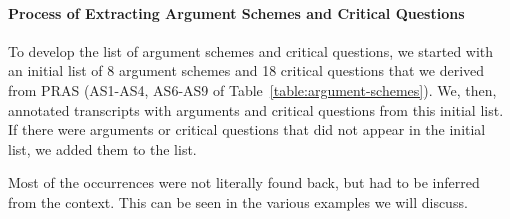 \paragraph{Process of Extracting Argument Schemes and Critical Questions} %

To develop the list of argument schemes and critical questions, we started with an initial list of 8 argument schemes and 18 critical questions that we derived from PRAS (AS1-AS4, AS6-AS9 of Table~\ref{table:argument-schemes}). We, then, annotated transcripts with arguments and critical questions from this initial list. If there were arguments or critical questions that did not appear in the initial list, we added them to the list.

Most of the occurrences were not literally found back, but had to be inferred from the context. This can be seen in the various examples we will discuss.



